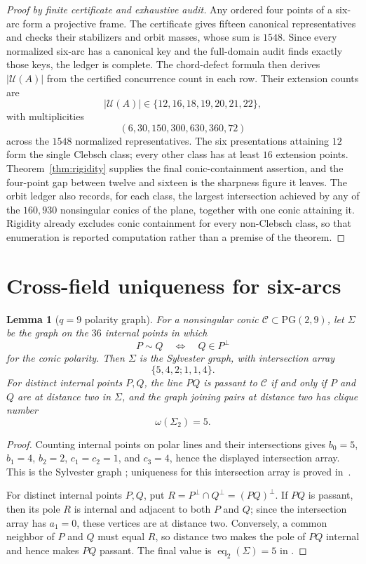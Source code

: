 \documentclass[11pt]{article}
\newtheorem{lemma}[theorem]{Lemma}
\theoremstyle{remark}
\newcommand{\PG}{\mathrm{PG}}
\newcommand{\cC}{\mathcal{C}}
\newcommand{\cU}{\mathcal{U}}
\begin{document}
\begin{proof}[Proof by finite certificate and exhaustive audit]
Any ordered four points of a six-arc form a projective frame.  The certificate
gives fifteen canonical representatives and checks their stabilizers and
orbit masses, whose sum is $1548$.  Since every normalized six-arc has a
canonical key and the full-domain audit finds exactly those keys, the ledger
is complete.  The chord-defect formula then derives $|\cU(A)|$ from the
certified concurrence count in each row.  Their extension counts are
\[
 |\cU(A)|\in\{12,16,18,19,20,21,22\},
\]
with multiplicities
\[
 (6,30,150,300,630,360,72)
\]
across the $1548$ normalized representatives. The six presentations
attaining $12$ form the single Clebsch class; every other class has at
least $16$ extension points. Theorem~\ref{thm:rigidity} supplies the final
conic-containment assertion, and the four-point gap between twelve and
sixteen is the sharpness figure it leaves.  The orbit ledger also records,
for each class, the largest intersection achieved by any of the $160{,}930$
nonsingular conics of the plane, together with one conic attaining it.
Rigidity already excludes conic containment for every non-Clebsch class, so
that enumeration is reported computation rather than a premise of the
theorem.
\end{proof}

\section{Cross-field uniqueness for six-arcs}

\begin{lemma}[$q=9$ polarity graph]
\label{lem:q9-polarity}
For a nonsingular conic $\cC\subset\PG(2,9)$, let $\Sigma$ be the graph on
the $36$ internal points in which
\[
 P\sim Q\quad\Longleftrightarrow\quad Q\in P^\perp
\]
for the conic polarity. Then $\Sigma$ is the Sylvester graph, with
intersection array
\[
 \{5,4,2;1,1,4\}.
\]
For distinct internal points $P,Q$, the line $PQ$ is passant to $\cC$ if
and only if $P$ and $Q$ are at distance two in $\Sigma$, and the graph
joining pairs at distance two has clique number
\[
 \omega(\Sigma_2)=5.
\]
\end{lemma}

\begin{proof}
Counting internal points on polar lines and their intersections gives
$b_0=5$, $b_1=4$, $b_2=2$, $c_1=c_2=1$, and $c_3=4$, hence the displayed
intersection array. This is the Sylvester graph
\cite[\S13.1.2]{BrouwerCohenNeumaier1989}; uniqueness for this intersection
array is proved in~\cite[Thm.~6]{JurisicVidali2019}.

For distinct internal points $P,Q$, put
$R=P^\perp\cap Q^\perp=(PQ)^\perp$. If $PQ$ is passant, then its pole $R$
is internal and adjacent to both $P$ and $Q$; since the intersection array
has $a_1=0$, these vertices are at distance two. Conversely, a common
neighbor of $P$ and $Q$ must equal $R$, so distance two makes the pole of
$PQ$ internal and hence makes $PQ$ passant. The final value is
$\operatorname{eq}_2(\Sigma)=5$ in
\cite[Table~1]{AbiadJabalAmeliReijnders2025}.
\end{proof}
\end{document}
